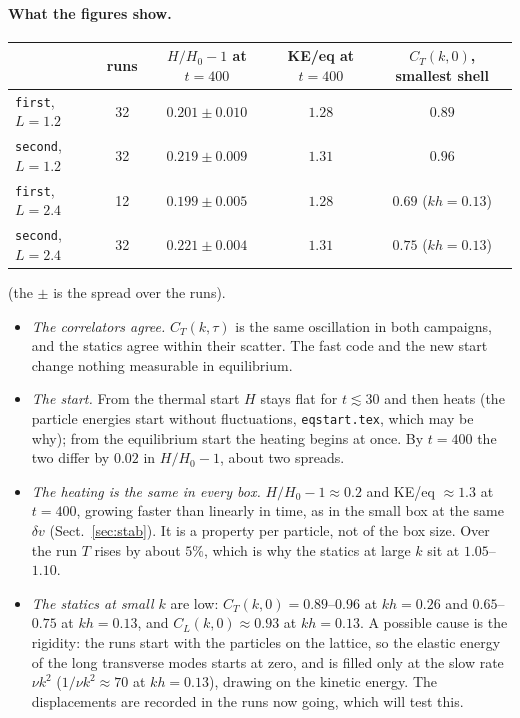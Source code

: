\documentclass[11pt,aps,preprint,nofootinbib,superscriptaddress,tightenlines]{revtex4-2}
\def\Sect#1{Sect.~\ref{#1}}
\let\oldparagraph\paragraph
\renewcommand{\paragraph}{\par\bigskip\oldparagraph}
\begin{document}
\paragraph{What the figures show.}
\begin{center}
\begin{tabular}{lcccc}
\hline
 & runs & $H/H_0-1$ at $t=400$ & KE/eq at $t=400$ & $C_T(k,0)$, smallest shell \\ \hline
\texttt{first}, $L=1.2$ & 32 & $0.201\pm0.010$ & $1.28$ & $0.89$ \\
\texttt{second}, $L=1.2$ & 32 & $0.219\pm0.009$ & $1.31$ & $0.96$ \\
\texttt{first}, $L=2.4$ & 12 & $0.199\pm0.005$ & $1.28$ & $0.69$ ($kh=0.13$) \\
\texttt{second}, $L=2.4$ & 32 & $0.221\pm0.004$ & $1.31$ & $0.75$ ($kh=0.13$) \\
\hline
\end{tabular}
\end{center}
(the $\pm$ is the spread over the runs).
\begin{itemize}
\item \emph{The correlators agree.}  $C_T(k,\tau)$ is the same oscillation in both
  campaigns, and the statics agree within their scatter.  The fast code and the new start
  change nothing measurable in equilibrium.
\item \emph{The start.}  From the thermal start $H$ stays flat for $t\lesssim30$ and then heats
  (the particle energies start without fluctuations, \texttt{eqstart.tex}, which may be why); from the
  equilibrium start the heating begins at once.  By $t=400$ the two differ by $0.02$ in
  $H/H_0-1$, about two spreads.
\item \emph{The heating is the same in every box.}  $H/H_0-1\approx0.2$ and KE/eq $\approx1.3$
  at $t=400$, growing faster than linearly in time, as in the small box at the same $\delta
  v$ (\Sect{sec:stab}).  It is a property per particle, not of the box size.  Over the run
  $T$ rises by about $5\%$, which is why the statics at large $k$ sit at $1.05$--$1.10$.
\item \emph{The statics at small $k$} are low: $C_T(k,0)=0.89$--$0.96$ at $kh=0.26$ and
  $0.65$--$0.75$ at $kh=0.13$, and $C_L(k,0)\approx0.93$ at $kh=0.13$.  A possible cause is the
  rigidity: the runs start with the particles on the lattice, so the elastic energy of the
  long transverse modes starts at zero, and is filled only at the slow rate $\nu k^2$
  ($1/\nu k^2\approx70$ at $kh=0.13$), drawing on the kinetic energy.  The displacements are
  recorded in the runs now going, which will test this.
\end{itemize}
\end{document}
